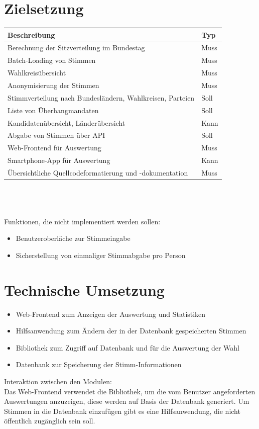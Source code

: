 \documentclass[11pt,a4paper]{scrartcl}
\begin{document}
\section{Zielsetzung}
\begin{tabular}{|l|l|}
    \hline
    \textbf{Beschreibung} & \textbf{Typ} \\
    \hline
    Berechnung der Sitzverteilung im Bundestag & Muss \\
    \hline
    Batch-Loading von Stimmen & Muss \\
    \hline
    Wahlkreisübersicht & Muss \\
    \hline
    Anonymisierung der Stimmen & Muss \\
    \hline
    Stimmverteilung nach Bundesländern, Wahlkreisen, Parteien & Soll \\
    \hline
    Liste von Überhangmandaten & Soll \\
    \hline
    Kandidatenübersicht, Länderübersicht & Kann \\
    \hline
    Abgabe von Stimmen über API & Soll \\
    \hline
    Web-Frontend für Auswertung & Muss \\
    \hline
    Smartphone-App für Auswertung & Kann \\
    \hline
    Übersichtliche Quellcodeformatierung und -dokumentation & Muss \\
    \hline
\end{tabular}\\
\\
\\
Funktionen, die nicht implementiert werden sollen:
\begin{itemize}
    \item Benutzeroberläche zur Stimmeingabe
    \item Sicherstellung von einmaliger Stimmabgabe pro Person
\end{itemize}

\section{Technische Umsetzung}
\begin{itemize}
    \item Web-Frontend zum Anzeigen der Auswertung und Statistiken
    \item Hilfsanwendung zum Ändern der in der Datenbank gespeicherten Stimmen
    \item Bibliothek zum Zugriff auf Datenbank und für die Auswertung der Wahl
    \item Datenbank zur Speicherung der Stimm-Informationen
\end{itemize}
Interaktion zwischen den Modulen:\\
Das Web-Frontend verwendet die Bibliothek, um die vom Benutzer angeforderten
Auswertungen anzuzeigen, diese werden auf Basis der Datenbank generiert. Um
Stimmen in die Datenbank einzufügen gibt es eine Hilfsanwendung, die nicht
öffentlich zugänglich sein soll.
\end{document}
